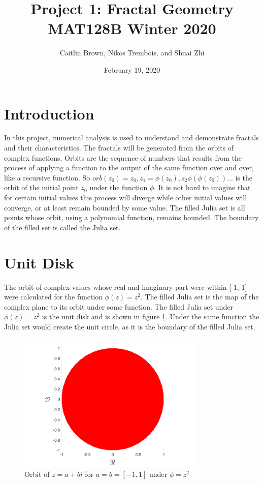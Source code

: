 \documentclass[letterpaper,11pt]{article}
\begin{document}
\title{Project 1: Fractal Geometry \\ 
		\large MAT128B Winter 2020}
\author{Caitlin Brown, Nikos Trembois, and Shuai Zhi}
\date{February 19, 2020}
\maketitle
\tableofcontents
\newpage

\section{Introduction}
In this project, numerical analysis is used to understand and demonstrate fractals and their characteristics. The fractals will be generated from the orbits of complex functions. Orbits are the sequence of numbers that results from the process of applying a function to the output of the same function over and over, like a recursive function. So $orb(z_0) = z_0, z_1 = \phi(z_0), z_2 \phi(\phi(z_0)) ...$ is the orbit of the initial point $z_0$ under the function $\phi$. It is not hard to imagine that for certain initial values this process will diverge while other initial values will converge, or at least remain bounded by some value. The filled Julia set is all points whose orbit, using a polynomial function, remains bounded. The boundary of the filled set is called the Julia set.

\section{Unit Disk}
The orbit of complex values whose real and imaginary part were within [-1, 1] were calculated for the function $\phi(z) = z^2$. The filled Julia set is the map of the complex plane to its orbit under some function. The filled Julia set under $\phi(z) = z^2$ is the unit disk and is shown in figure \ref{fig:unitDisk}. Under the same function the Julia set would create the unit circle, as it is the boundary of the filled Julia set. 

\begin{figure}
	\centering
	\includegraphics[width=3.5in]{../Figures/UnitDisk.png}
	\caption{Orbit of $z = a + bi$ for $a = b = [-1,1]$ under $\phi=z^2$}
	\label{fig:unitDisk}
\end{figure}
\end{document}

